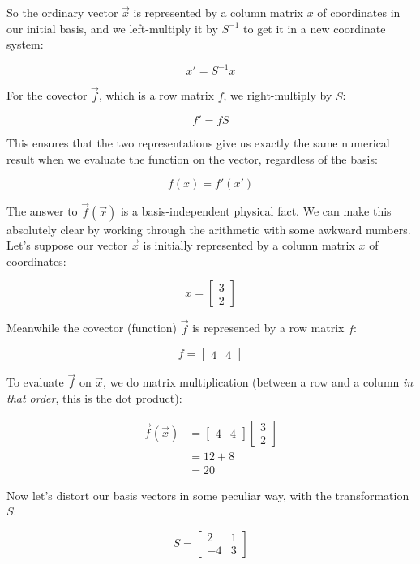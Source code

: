 So the ordinary vector $\vec{x}$ is represented by a column matrix $x$ of coordinates in our initial basis, and we left-multiply it by $S^{-1}$ to get it in a new coordinate system:

$$
x' = S^{-1} x
$$

For the covector $\vec{f}$, which is a row matrix $f$, we right-multiply by $S$:

$$
f' = f S
$$

This ensures that the two representations give us exactly the same numerical result when we evaluate the function on the vector, regardless of the basis:

$$
f(x) = f'(x')
$$

The answer to $\vec{f}(\vec{x})$ is a basis-independent physical fact. We can make this absolutely clear by working through the arithmetic with some awkward numbers. Let's suppose our vector $\vec{x}$ is initially represented by a column matrix $x$ of coordinates:

$$
x = \begin{bmatrix} 3 \\ 2 \end{bmatrix}
$$

Meanwhile the covector (function) $\vec{f}$ is represented by a row matrix $f$:

$$
f = \begin{bmatrix} 4 & 4 \end{bmatrix}
$$

To evaluate $\vec{f}$ on $\vec{x}$, we do matrix multiplication (between a row and a column \textit{in that order}, this is the dot product):

\begin{equation}
\begin{split}
    \vec{f}(\vec{x}) &= \begin{bmatrix} 4 & 4 \end{bmatrix} \begin{bmatrix} 3 \\ 2 \end{bmatrix} \\
    &= 12 + 8 \\
    &= 20
\end{split}
\end{equation}

Now let's distort our basis vectors in some peculiar way, with the transformation $S$:

$$
S = \begin{bmatrix}
    2 & 1 \\
    -4 & 3
\end{bmatrix}
$$

